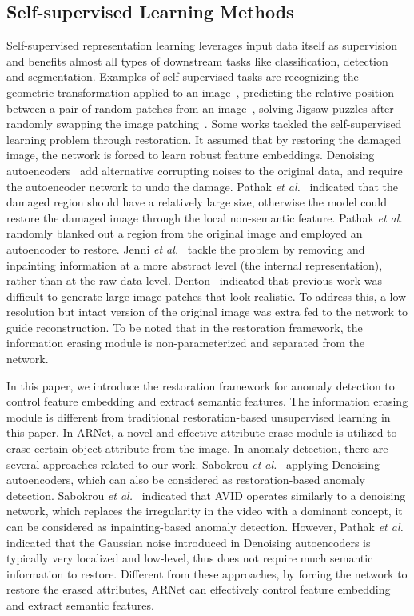 \documentclass[journal]{IEEEtran}
\begin{document}
\subsection{Self-supervised Learning Methods}
Self-supervised representation learning leverages input data itself as supervision and benefits almost all types of downstream tasks like classification, detection and segmentation. 
Examples of self-supervised tasks are recognizing the geometric transformation applied to an image~\cite{gidaris2018unsupervised}, 
predicting the relative position between a pair of random patches from an image~\cite{doersch2015unsupervised}, solving Jigsaw puzzles after randomly swapping the image patching~\cite{noroozi2016unsupervised}. Some works tackled the self-supervised learning problem through restoration. It assumed that by restoring the damaged image, the network is forced to learn robust feature embeddings.
Denoising autoencoders~\cite{vincent2008extracting} add alternative corrupting noises to the original data, and require the autoencoder network to undo the damage. Pathak \emph{et al.}~\cite{pathak2016context} indicated that the damaged region should have a relatively large size, otherwise the model could restore the damaged image through the local non-semantic feature. Pathak \emph{et al.}~\cite{pathak2016context} randomly blanked out a region from the original image and employed an autoencoder to restore.
Jenni \emph{et al.}~\cite{Jenni_2018_CVPR} tackle the problem by removing and inpainting information at a more abstract level (the internal representation), rather than at the raw data level. Denton~\cite{denton2016semi} indicated that previous work was difficult to generate large image patches that look realistic. To address this, a low resolution but intact version of the original image was extra fed to the network to guide reconstruction. To be noted that in the restoration framework, the information erasing module is non-parameterized and separated from the network.

In this paper, we introduce the restoration framework for anomaly detection to control feature embedding and extract semantic features. The information erasing module is different from traditional restoration-based unsupervised learning in this paper. In ARNet, a novel and effective attribute erase module is utilized to erase certain object attribute from the image.  In anomaly detection, there are several approaches related to our work. Sabokrou \emph{et al.}~\cite{Sabokrou2018Adversarially,sabokrou2020deep} applying Denoising autoencoders\cite{vincent2008extracting}, which can also be considered as restoration-based anomaly detection. Sabokrou \emph{et al.}~\cite{sabokrou2018avid} indicated that AVID operates similarly to a denoising network, which replaces the irregularity in the video with a dominant concept, it can be considered as inpainting-based anomaly detection. However, Pathak \emph{et al.}~\cite{pathak2016context} indicated that the Gaussian noise introduced in Denoising autoencoders is typically very localized and low-level, thus does not require much semantic information to restore. Different from these approaches, by forcing the network to restore the erased attributes, ARNet can effectively control feature embedding and extract semantic features.
\end{document}
